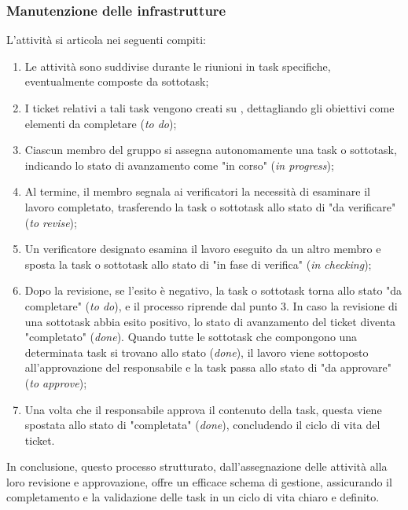 \subsubsection{Manutenzione delle infrastrutture}
L'attività si articola nei seguenti compiti:
            \begin{enumerate}
                
            \item Le attività sono suddivise durante le riunioni in task specifiche, eventualmente composte da sottotask;
            \item I ticket relativi a tali task vengono creati su , dettagliando gli obiettivi come elementi da completare (\textit{to do});
            \item Ciascun membro del gruppo si assegna autonomamente una task o sottotask, indicando lo stato di avanzamento come "in corso" (\textit{in progress});
            \item Al termine, il membro segnala ai verificatori la necessità di esaminare il lavoro completato, trasferendo la task o sottotask allo stato di "da verificare" (\textit{to revise});
            \item Un verificatore designato esamina il lavoro eseguito da un altro membro e sposta la task o sottotask allo stato di "in fase di verifica" (\textit{in checking});
            \item Dopo la revisione, se l'esito è negativo, la task o sottotask torna allo stato "da completare" (\textit{to do}), e il processo riprende dal punto 3. In caso la revisione di una sottotask abbia esito positivo, lo stato di avanzamento                    del ticket diventa "completato" (\textit{done}). Quando tutte le sottotask che compongono una determinata task si trovano allo stato (\textit{done}), il lavoro viene sottoposto all'approvazione del responsabile e la task passa allo                     stato di "da approvare" (\textit{to approve});
            \item Una volta che il responsabile approva il contenuto della task, questa viene spostata allo stato di "completata" (\textit{done}), concludendo il ciclo di vita del ticket.
            \end{enumerate}
In conclusione, questo processo strutturato, dall'assegnazione delle attività alla loro revisione e approvazione, offre un efficace schema di gestione, assicurando il completamento e la validazione delle task in un ciclo di vita chiaro e definito.

